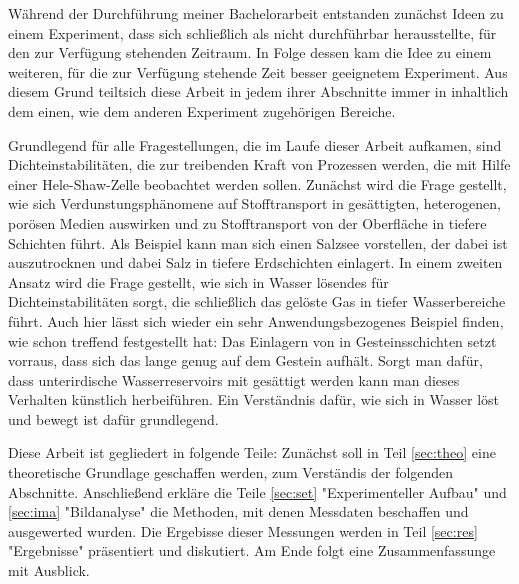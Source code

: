 
\label{sec:intro}

Während der Durchführung meiner Bachelorarbeit entstanden zunächst Ideen zu einem Experiment, dass sich schließlich als nicht durchführbar herausstellte, für den zur Verfügung stehenden Zeitraum. In Folge dessen kam die Idee zu einem weiteren, für die zur Verfügung stehende Zeit besser geeignetem Experiment. Aus diesem Grund teiltsich diese Arbeit in jedem ihrer Abschnitte immer in inhaltlich dem einen, wie dem anderen Experiment zugehörigen Bereiche.

Grundlegend für alle Fragestellungen, die im Laufe dieser Arbeit aufkamen, sind Dichteinstabilitäten, die zur treibenden Kraft von Prozessen werden, die mit Hilfe einer Hele-Shaw-Zelle beobachtet werden sollen.
Zunächst wird die Frage gestellt, wie sich Verdunstungsphänomene auf Stofftransport in gesättigten, heterogenen, porösen Medien auswirken und zu Stofftransport von der Oberfläche in tiefere Schichten führt. Als Beispiel kann man sich einen Salzsee vorstellen, der dabei ist auszutrocknen und dabei Salz in tiefere Erdschichten einlagert.
In einem zweiten Ansatz wird die Frage gestellt, wie sich in Wasser lösendes \COT für Dichteinstabilitäten sorgt, die schließlich das gelöste Gas in tiefer Wasserbereiche führt. Auch hier lässt sich wieder ein sehr Anwendungsbezogenes Beispiel finden, wie schon \cite{fernandez} treffend festgestellt hat: Das Einlagern von \COT in Gesteinsschichten setzt vorraus, dass sich das \COT lange genug auf dem Gestein aufhält. Sorgt man dafür, dass unterirdische Wasserreservoirs mit \COT gesättigt werden kann man dieses Verhalten künstlich herbeiführen. Ein Verständnis dafür, wie sich \COT in Wasser löst und bewegt ist dafür grundlegend.

Diese Arbeit ist gegliedert in folgende Teile: Zunächst soll in Teil \ref{sec:theo} eine theoretische Grundlage geschaffen werden, zum Verständis der folgenden Abschnitte. Anschließend erkläre die Teile \ref{sec:set} "Experimenteller Aufbau" und \ref{sec:ima} "Bildanalyse" die Methoden, mit denen Messdaten beschaffen und ausgewerted wurden. Die Ergebisse dieser Messungen werden in Teil \ref{sec:res} "Ergebnisse" präsentiert und diskutiert. 
Am Ende folgt eine Zusammenfassunge mit Ausblick.